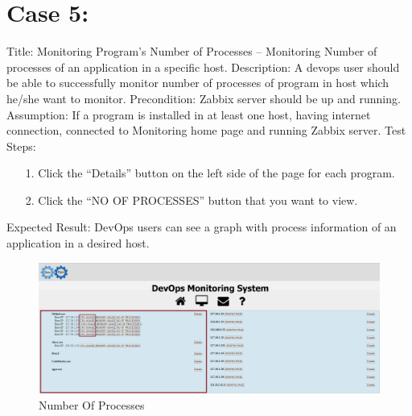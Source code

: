 \documentclass{article}
\begin{document}
	\section*{Case 5:}
	Title: Monitoring Program’s Number of Processes  – Monitoring Number of processes of an application in a specific host.
	\newline
	Description: A devops user should be able to successfully monitor number of processes of program in  host which he/she want to monitor.
	\newline
		Precondition: Zabbix server should be up and running.
	\newline
	Assumption:  If a program is installed in at least one host, having internet connection, connected to Monitoring home page and running Zabbix server.
	\newline
	\newline
	Test Steps:
	\begin{itemize}
	

	\item[1.]Click the “Details” button on the left side of the page for each program.
	\item[2.]Click the “NO OF PROCESSES” button that you want to view.
	\end{itemize}
	Expected Result: DevOps users can see a graph with process information of an application in a desired host.
	
		\begin{figure}[H]
		\centering
		\includegraphics[width=\linewidth]{3}
		\caption{Number Of Processes}
	\end{figure}
	
	
	
\end{document}
